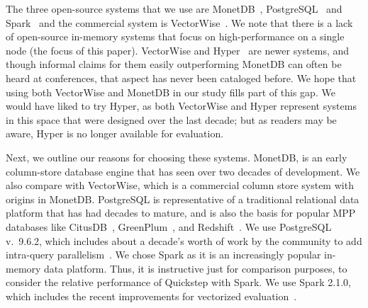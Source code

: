 The three open-source systems that we use are MonetDB~\cite{monetdb}, PostgreSQL~\cite{postgres} and Spark~\cite{Spark, SparkSQL} and the commercial system is VectorWise~\cite{vectorwise}. We note that there is a lack of open-source in-memory systems that focus on high-performance on a single node (the focus of this paper). VectorWise and Hyper~\cite{hyper} are newer systems, and though informal claims for them easily outperforming MonetDB can often be heard at conferences, that aspect has never been cataloged before. We hope that using both VectorWise  and MonetDB in our study fills part of this gap. We would have liked to try Hyper, as both VectorWise and Hyper represent systems in this space that were designed over the last decade; but as readers may be aware, Hyper is no longer available for evaluation.

Next, we outline our reasons for choosing these systems.
MonetDB, is an early column-store database engine that has seen over two decades of development.
We also compare with VectorWise, which is a commercial column store system with origins in MonetDB.
PostgreSQL is representative of a traditional relational data platform that has had decades to mature, and is also the basis for popular MPP databases like CitusDB~\cite{citusdata}, GreenPlum~\cite{greenplum}, and Redshift~\cite{redshift}. We use PostgreSQL v.~9.6.2, which includes about a decade's worth of work by the community to add intra-query parallelism~\cite{pg-parallelquery}.
We chose Spark as it is an increasingly popular in-memory data platform. Thus, it is instructive just for comparison purposes, to consider the relative performance of Quickstep with Spark. We use Spark 2.1.0, which includes the recent improvements for vectorized evaluation~\cite{spark-10x-in-2}.


